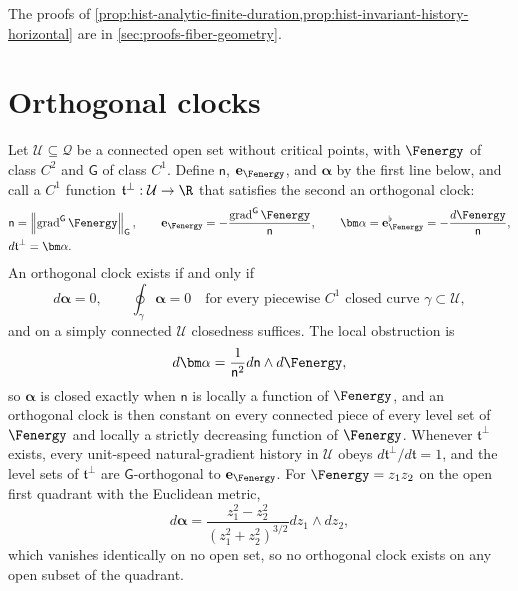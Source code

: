 The proofs of \cref{prop:hist-analytic-finite-duration,prop:hist-invariant-history-horizontal}
are in \cref{sec:proofs-fiber-geometry}.

\section{Orthogonal clocks}
\label{sec:hist-global-clock}

Let $\mathcal U\subseteq\mathcal Q$ be a connected open set without critical points, with
$\Fenergy$ of class $C^2$ and $\mathsf G$ of class $C^1$.  Define $\mathsf n$,
$\mathbf e_{\Fenergy}$, and $\bm\alpha$ by the first line below, and call a $C^1$
function $\mathfrak t^\perp:\mathcal U\to\R$ that satisfies the second an orthogonal
clock:
\begin{align}
&\mathsf n=\left\|\operatorname{grad}^{\mathsf G}\Fenergy\right\|_{\mathsf G},
\qquad
\mathbf e_{\Fenergy}=-\frac{\operatorname{grad}^{\mathsf G}\Fenergy}{\mathsf n},
\qquad
\bm\alpha=\mathbf e_{\Fenergy}^\flat=-\frac{d\Fenergy}{\mathsf n},
\label{eq:hist-normalized-vfe-one-form}\\
&d\mathfrak t^\perp=\bm\alpha.
\label{eq:hist-global-clock-potential}
\end{align}
An orthogonal clock exists if and only if
\begin{equation}
d\bm\alpha=0,
\qquad
\oint_\gamma\bm\alpha=0
\quad\text{for every piecewise $C^1$ closed curve }\gamma\subset\mathcal U,
\label{eq:hist-global-clock-period-criterion}
\end{equation}
and on a simply connected $\mathcal U$ closedness suffices.  The local obstruction is
\begin{equation}
d\bm\alpha=\frac{1}{\mathsf n^2} d\mathsf n\wedge d\Fenergy,
\label{eq:hist-normalized-form-curvature}
\end{equation}
so $\bm\alpha$ is closed exactly when $\mathsf n$ is locally a function of $\Fenergy$,
and an orthogonal clock is then constant on every connected piece of every level set of
$\Fenergy$ and locally a strictly decreasing function of $\Fenergy$.  Whenever
$\mathfrak t^\perp$ exists, every unit-speed natural-gradient history in $\mathcal U$
obeys $d\mathfrak t^\perp/d\mathfrak t=1$, and the level sets of $\mathfrak t^\perp$ are
$\mathsf G$-orthogonal to $\mathbf e_{\Fenergy}$.  For $\Fenergy=z_1z_2$ on the open first
quadrant with the Euclidean metric,
\begin{equation}
d\bm\alpha
=\frac{z_1^2-z_2^2}{(z_1^2+z_2^2)^{3/2}} dz_1\wedge dz_2,
\label{eq:hist-nonexact-clock-example}
\end{equation}
which vanishes identically on no open set, so no orthogonal clock exists on any open
subset of the quadrant.  

